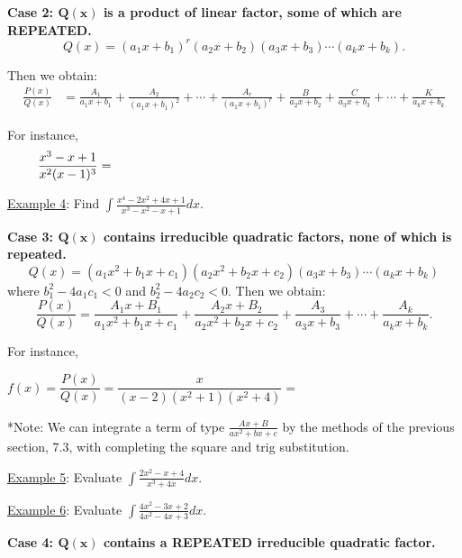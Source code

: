 \documentclass[paper=a4, fontsize=11pt]{scrartcl} %
\numberwithin{equation}{section} %
\numberwithin{figure}{section} %
\numberwithin{table}{section} %
\newcommand{\ds}{\displaystyle}
\begin{document}
\textbf{Case 2: $\mathbf{Q(x)}$ is a product of linear factor, some of which are REPEATED.}\\

\[Q(x) = (a_1x+b_1)^r(a_2x+b_2)(a_3x+b_3)\cdots(a_kx+b_k).\]

Then we obtain:
\begin{align*}
\ds\frac{P(x)}{Q(x)} &= \ds\frac{A_1}{a_1x+b_1} + \ds\frac{A_2}{(a_1x+b_1)^2} + \cdots + \ds\frac{A_r}{(a_1x+b_1)^r} +\ds\frac{B}{a_2x+b_2} + \ds\frac{C}{a_3x+b_3} + \cdots + \ds\frac{K}{a_kx + b_k}
\end{align*}

For instance,
\[\ds\frac{x^3 - x + 1}{x^2(x-1)^3} = \hspace{3.5in}\]
\indent
\indent

\underline{Example 4}: Find $\ds\int\ds\frac{x^4 - 2x^2 + 4x+1}{x^3 - x^2 - x + 1}dx$.\\
\indent

\newpage




\textbf{Case 3: $\mathbf{Q(x)}$ contains irreducible quadratic factors, none of which is repeated.}\\

\[Q(x) = (a_1x^2+b_1x+c_1)(a_2x^2+b_2x + c_2)(a_3x+b_3)\cdots(a_kx+b_k)\]
where $b_1^2-4a_1c_1<0$ and $b_2^2-4a_2c_2<0$. Then we obtain:
\[\ds\frac{P(x)}{Q(x)} = \ds\frac{A_1x+B_1}{a_1x^2+b_1x+c_1} + \ds\frac{A_2x+B_2}{a_2x^2 + b_2x+ c_2} + \ds\frac{A_3}{a_3x+b_3} + \cdots + \ds\frac{A_k}{a_kx+b_k}.\]

For instance,

\[f(x) = \ds\frac{P(x)}{Q(x)} = \ds\frac{x}{(x-2)(x^2+1)(x^2+4)} = \hspace{3in}\]

*Note: We can integrate a term of type $\ds\frac{Ax+B}{ax^2+bx+c}$ by the methods of the previous section, 7.3, with completing the square and trig substitution.\\
\indent


\underline{Example 5}: Evaluate $\ds\int \ds\frac{2x^2-x+4}{x^3+4x}dx$.\\
\indent

\newpage

\underline{Example 6}: Evaluate $\ds\int\ds\frac{4x^2-3x+2}{4x^2-4x+3}dx$.\\
\indent

\vspace{3.5in}

\textbf{Case 4: $\mathbf{Q(x)}$ contains a REPEATED irreducible quadratic factor.}\\
\end{document}
